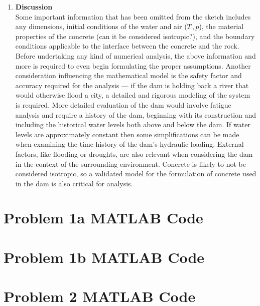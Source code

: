 \documentclass[12pt,letterpaper]{article}
\begin{document}
	\begin{enumerate}[label=\arabic*.]
		
		\item{\textbf{Discussion}}\\
		Some important information that has been omitted from the sketch includes any dimensions, initial conditions of the water and air ($T\,,p$), the material properties of the concrete (can it be considered isotropic?), and the boundary conditions applicable to the interface between the concrete and the rock. Before undertaking any kind of numerical analysis, the above information and more is required to even begin formulating the proper assumptions. Another consideration influencing the mathematical model is the safety factor and accuracy required for the analysis --- if the dam is holding back a river that would otherwise flood a city, a detailed and rigorous modeling of the system is required. More detailed evaluation of the dam would involve fatigue analysis and require a history of the dam, beginning with its construction and including the historical water levels both above and below the dam. If water levels are approximately constant then some simplifications can be made when examining the time history of the dam's hydraulic loading. External factors, like flooding or droughts, are also relevant when considering the dam in the context of the surrounding environment. Concrete is likely to not be considered isotropic, so a validated model for the formulation of concrete used in the dam is also critical for analysis. 

		
	\end{enumerate}

	\newpage
	
	\begin{appendices}
		\section{Problem 1a MATLAB Code}
		
		\newpage
		\section{Problem 1b MATLAB Code}
		
		\newpage
		\section{Problem 2 MATLAB Code}
		
		\end{appendices}
	
\end{document}
